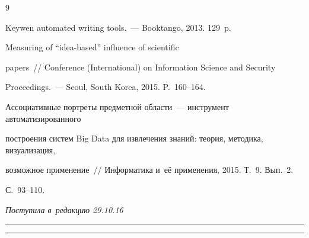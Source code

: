 {{\begin{thebibliography}{9}

      Keywen automated writing tools.~--- Booktango, 2013. 129~p.


      Measuring of ``idea-based'' influence of scientific 

papers~/\!\!/ Conference (International) on Information Science and Security 

Proceedings.~--- Seoul, South Korea, 2015. P.~160--164.





Ассоциативные портреты предметной области~--- инструмент автоматизированного 

построения систем Big Data для извлечения знаний: теория, методика, визуализация, 

возможное применение~/\!\!/ Информатика и~её применения, 2015. Т.~9. Вып.~2.  

С.~93--110.

       \end{thebibliography}

} }





\vspace*{-3pt}



\hfill{\small\textit{Поступила в~редакцию 29.10.16}}









\vspace*{9pt}



\hrule






\vspace*{2pt}



\hrule










